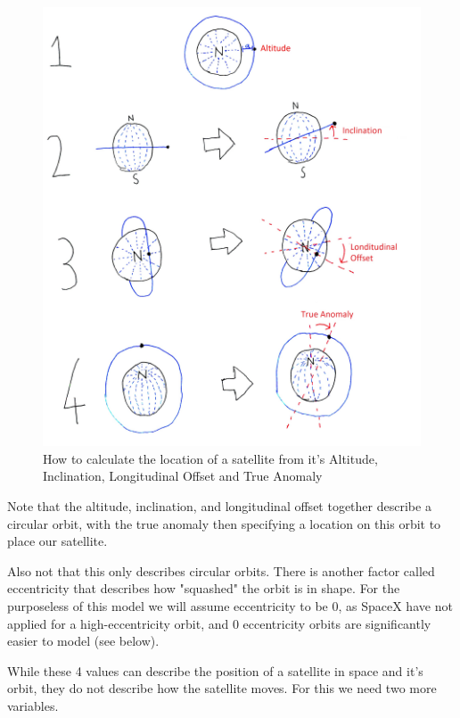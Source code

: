 \documentclass[12pt]{report}
\begin{document}
\begin{figure}
	\caption{How to calculate the location of a satellite from it's Altitude, Inclination, Longitudinal Offset and True Anomaly}
	\label{Describing an orbit}
	\includegraphics[width=\textwidth]{DescribingAnOrbit}
\end{figure}

Note that the altitude, inclination, and longitudinal offset together describe a circular orbit, with the true anomaly then specifying a location on this orbit to place our satellite.

Also not that this only describes circular orbits. There is another factor called eccentricity that describes how "squashed" the orbit is in shape. For the purposeless of this model we will assume eccentricity to be 0, as SpaceX have not applied for a high-eccentricity orbit\cite{FCCApplication}, and 0 eccentricity orbits are significantly easier to model (see below).


While these 4 values can describe the position of a satellite in space and it's orbit, they do not describe how the satellite moves. For this we need two more variables.
\end{document}
